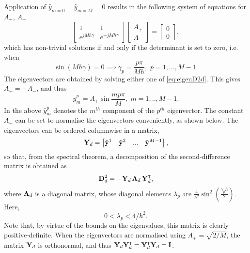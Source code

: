 \documentclass[11pt,twoside,a4paper,english]{book}
\begin{document}
Application of ${\hat{y}}_{m=0}={\hat{y}}_{m=M}=0$ results in the following system of equations for $A_+$, $A_-$
\begin{equation}\label{eq:eigenD2d}
\begin{bmatrix}
1 & 1 \\
e^{jMh\gamma} & e^{-jMh\gamma}
\end{bmatrix}
\begin{bmatrix}
A_+ \\
A_-
\end{bmatrix}=
\begin{bmatrix}
0 \\
0
\end{bmatrix},
\end{equation}
which has non-trivial solutions if and only if the determinant is set to zero, i.e. when
\begin{equation}\label{eq:waveNrD2d}
\sin ({Mh\gamma}) = 0  \implies  \gamma_p = \frac{p \pi}{M h}, \,\, p = 1,...,M-1.
\end{equation}
The eigenvectors are obtained by solving either one of \eqref{eq:eigenD2d}. This gives $A_+=-A_-$, and thus
\begin{equation}\label{eq:EigenVecsD2d}
{\hat y}^p_m = A_+ \sin \frac{mp\pi}{M },\,\, m = 1,..,M-1.
\end{equation}
In the above $\hat{ y}^p_m$ denotes the $m^{th}$ component of the $p^{th}$ eigenvector. The constant $A_+$ can be set to normalise the eigenvectors conveniently, as shown below. 
The eigenvectors can be ordered columnwise in a matrix,
\begin{equation}
{\bf Y}_d = \begin{bmatrix}\hat {\bf y}^1 & \hat{\bf y}^2 & ... & \hat{\bf y}^{M-1}\end{bmatrix},
\end{equation}
so that, from the spectral theorem, a decomposition of the second-difference matrix is obtained as
\begin{equation}\label{eq:DecompD2d}
{\bf D}^{2}_d = -{\bf Y}_d \, {\bf \Lambda}_d \, {\bf Y}^\intercal_d,
\end{equation}
where ${{\bf \Lambda}_d}$ is a diagonal matrix, whose diagonal elements $\lambda_p$ are  $\frac{4}{h^2}\sin^2 \left( \frac{\gamma_p h}{2}\right)$. Here, 
\begin{equation}\label{eq:BndLambdaD2d}
0 < \lambda_p < 4/h^2.
\end{equation}
Note that, by virtue of the bounds on the eigenvalues, this matrix is clearly positive-definite. 
When the eigenvectors are normalised using $A_+ = \sqrt{2/M}$, the matrix ${\bf Y}_d$ is orthonormal, and thus ${\bf Y}_d {\bf Y}_d^{\intercal}={\bf Y}_d^\intercal {\bf Y}_d = {\bf I}$.
\end{document}
